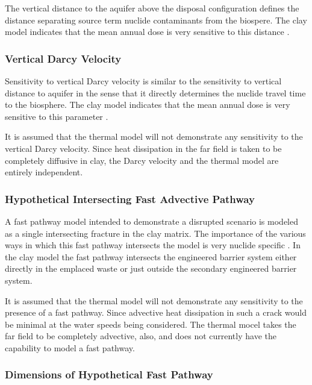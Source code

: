 The vertical distance to the aquifer above the disposal configuration defines 
the distance separating source term nuclide contaminants from the biospere. The 
clay model indicates that the mean annual dose is very sensitive to this 
distance \cite{clayton_generic_2011}.

\subsubsection{Vertical Darcy Velocity}

Sensitivity to vertical Darcy velocity is similar to the sensitivity to vertical 
distance to aquifer in the sense that it directly determines the nuclide travel 
time to the biosphere. The clay model indicates that the mean annual dose is 
very sensitive to this parameter \cite{clayton_generic_2011}.

It is assumed that the thermal model will not demonstrate any
sensitivity to the vertical Darcy velocity. Since heat dissipation in the far 
field is taken to be completely diffusive in clay, the Darcy velocity and the 
thermal model are entirely independent.

\subsubsection{Hypothetical Intersecting Fast Advective Pathway}

A fast pathway model intended to demonstrate a disrupted scenario is modeled as 
a single intersecting fracture in the clay matrix. The importance of the various 
ways in which this fast pathway intersects the model is very nuclide specific 
\cite{clayton_generic_2011}. In the clay model the fast pathway intersects the 
engineered barrier system either directly in the emplaced waste or just outside 
the secondary engineered barrier system.

It is assumed that the thermal model will not demonstrate any
sensitivity to the presence of a fast pathway. Since advective heat dissipation 
in such a crack would be minimal at the water speeds being considered. The 
thermal mocel takes the far field to be completely advective, also, and does not 
currently have the capability to model a fast pathway.

\subsubsection{Dimensions of Hypothetical Fast Pathway}

